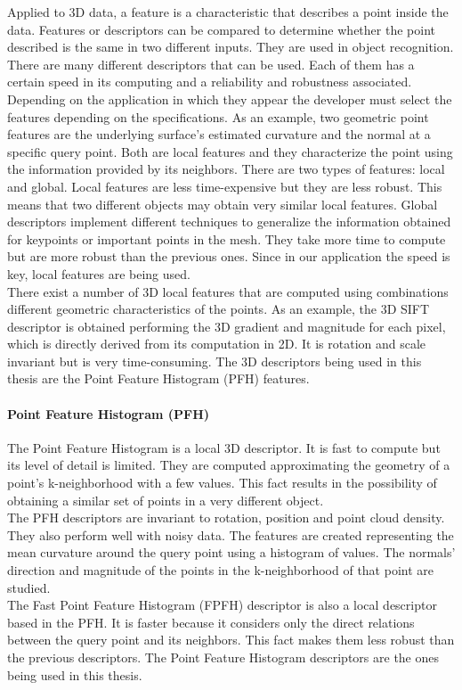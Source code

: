 Applied to 3D data, a feature is a characteristic that describes a point inside the data. Features or descriptors can be compared to determine whether the point described is the same in two different inputs. They are used in object recognition. 
There are many different descriptors that can be used. Each of them has a certain speed in its computing and a reliability and robustness associated. Depending on the application in which they appear the developer must select the features depending on the specifications. 
As an example, two geometric point features are the underlying surface's estimated curvature and the normal at a specific query point. 
Both are local features and they characterize the point using the information provided by its neighbors. 
There are two types of features: local and global. 
Local features are less time-expensive but they are less robust. 
This means that two different objects may obtain very similar local features.
Global descriptors implement different techniques to generalize the information obtained for keypoints or important points in the mesh. 
They take more time to compute but are more robust than the previous ones. 
Since in our application the speed is key, local features are being used. 
\\

There exist a number of 3D local features that are computed using combinations different geometric characteristics of the points. 
As an example, the 3D SIFT descriptor \cite{Scovanner2007} is obtained performing the 3D gradient and magnitude for each pixel, which is directly derived from its computation in 2D. 
It is rotation and scale invariant but is very time-consuming. 
The 3D descriptors being used in this thesis are the Point Feature Histogram (PFH) features. 

\paragraph{Point Feature Histogram (PFH)}\mbox{}
\label{pfh}

The Point Feature Histogram \cite{Rusu2008} is a local 3D descriptor. 
It is fast to compute but its level of detail is limited. 
They are computed approximating the geometry of a point's k-neighborhood with a few values. 
This fact results in the possibility of obtaining a similar set of points in a very different object. 
\\

The PFH descriptors are invariant to rotation, position and point cloud density. 
They also perform well with noisy data. 
The features are created representing the mean curvature around the query point using a histogram of values. 
The normals' direction and magnitude of the points in the k-neighborhood of that point are studied. 
\\

The Fast Point Feature Histogram (FPFH) \cite{Rusu} descriptor is also a local descriptor based in the PFH. 
It is faster because it considers only the direct relations between the query point and its neighbors.
This fact makes them less robust than the previous descriptors. 
The Point Feature Histogram descriptors are the ones being used in this thesis. 
